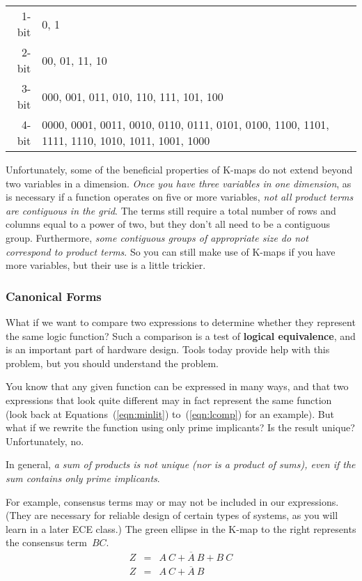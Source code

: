 \begin{tabular}{rl}
1-bit& 0, 1\\
2-bit& 00, 01, 11, 10\\
3-bit& 000, 001, 011, 010, 110, 111, 101, 100\\
4-bit& 
0000, 0001, 0011, 0010, 0110, 0111, 0101, 0100,
1100, 1101, 1111, 1110, 1010, 1011, 1001, 1000
\end{tabular}

Unfortunately, some of the beneficial properties of \mbox{K-maps} do
not extend beyond two variables in a dimension.  {\em Once you have three
variables in one dimension}, as is necessary if a function operates
on five or more variables, {\em not all product terms are contiguous
in the grid}.  The terms still require a total number of rows and columns
equal to a power of two, but they don't all need to be a contiguous
group.  Furthermore, {\em some contiguous groups of appropriate size do
not correspond to product terms}.  So you can still make use of \mbox{K-maps}
if you have more variables, but their use is a little trickier.\\

\subsubsection{Canonical Forms}

What if we want to compare two expressions to determine whether they
represent the same logic function?  Such a comparison is a test of
{\bf logical equivalence}, and is an important part of hardware design.
Tools today provide help with this problem, but you should understand
the problem.

You know that any given function can be expressed in many ways, and that
two expressions that look quite different may in fact represent the
same function (look back at Equations~(\ref{eqn:minlit}) to~(\ref{eqn:lcomp})
for an example).  But what if we rewrite the function using only 
prime implicants?  Is the result unique?  Unfortunately, no.

\begin{minipage}{5.15in}
In general, {\em a sum of products is not unique (nor is a product of sums),
even if the sum contains only prime implicants}.\mpline

For example, consensus terms may or may not be included in our
expressions.  (They are necessary for reliable design of 
certain types of systems, as you will learn in a later ECE class.)
%
The green ellipse in the K-map to the right represents the consensus 
term~$BC$.
\begin{eqnarray*}
Z &=& A~C + \overline{A}~B + B~C\\
Z &=& A~C + \overline{A}~B
\end{eqnarray*}
\end{minipage}\hspace{.35in}%
\begin{minipage}{1in}
\end{minipage}\vspace{12pt}

